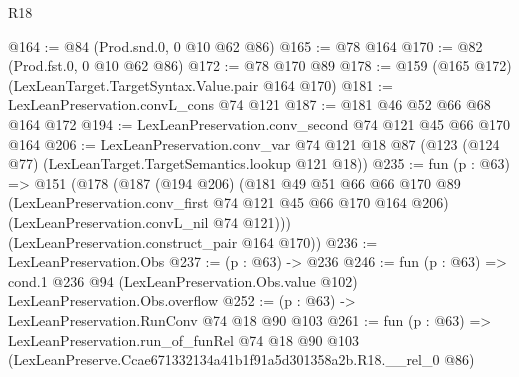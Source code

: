 \begin{lexlean}{R18}
\begin{coremodule}
@164 := @84 (Prod.snd.{0, 0} @10 @62 @86)
@165 := @78 @164
@170 := @82 (Prod.fst.{0, 0} @10 @62 @86)
@172 := @78 @170 @89
@178 := @159 (@165 @172) (LexLeanTarget.TargetSyntax.Value.pair @164 @170)
@181 := LexLeanPreservation.convL_cons @74 @121
@187 := @181 @46 @52 @66 @68 @164 @172
@194 := LexLeanPreservation.conv_second @74 @121 @45 @66 @170 @164
@206 := LexLeanPreservation.conv_var
    @74
    @121
    @18
    @87
    (@123 (@124 @77) (LexLeanTarget.TargetSemantics.lookup @121 @18))
@235 := fun (p : @63) =>
  @151
    (@178
      (@187
        (@194 @206)
        (@181
          @49
          @51
          @66
          @66
          @170
          @89
          (LexLeanPreservation.conv_first @74 @121 @45 @66 @170 @164 @206)
          (LexLeanPreservation.convL_nil @74 @121)))
      (LexLeanPreservation.construct_pair @164 @170))
@236 := LexLeanPreservation.Obs
@237 := (p : @63) -> @236
@246 := fun (p : @63) =>
  cond.{1} @236 @94 (LexLeanPreservation.Obs.value @102) LexLeanPreservation.Obs.overflow
@252 := (p : @63) -> LexLeanPreservation.RunConv @74 @18 @90 @103
@261 := fun (p : @63) =>
  LexLeanPreservation.run_of_funRel
    @74
    @18
    @90
    @103
    (LexLeanPreserve.Ccae671332134a41b1f91a5d301358a2b.R18.__rel_0 @86)
\end{coremodule}
\end{lexlean}
